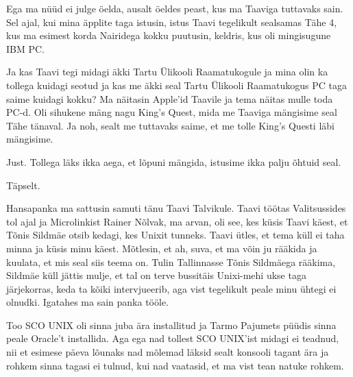 
Ega ma nüüd ei julge öelda, ausalt öeldes peast, kus ma Taaviga tuttavaks sain. 
Sel ajal, kui mina äpplite taga istusin, istus Taavi tegelikult sealsamas Tähe 
4, kus ma esimest korda Nairidega kokku puutusin, keldris, kus oli mingisugune 
IBM PC.

Ja kas Taavi tegi midagi äkki Tartu Ülikooli Raamatukogule ja mina olin ka tollega kuidagi seotud ja kas me äkki seal 
Tartu Ülikooli Raamatukogus PC taga saime kuidagi kokku? Ma näitasin Apple'id 
Taavile ja tema näitas mulle toda PC-d. Oli sihukene mäng nagu King's 
Quest, mida me Taaviga mängisime seal Tähe tänaval. 
Ja noh, sealt me tuttavaks saime, et me tolle King's Questi läbi mängisime.


Just. Tollega läks ikka aega, et lõpuni mängida,  istusime ikka palju õhtuid 
seal.


Täpselt. 


Hansapanka ma sattusin samuti tänu Taavi Talvikule. 
Taavi töötas Valitsussides tol ajal ja 
Microlinkist Rainer Nõlvak, ma 
arvan, oli see, kes küsis Taavi käest,  et Tõnis Sildmäe otsib kedagi, kes Unixit tunneks. Taavi ütles, et tema küll ei taha 
minna ja küsis minu käest. Mõtlesin, et ah, suva, et ma võin ju rääkida ja 
kuulata, et mis seal siis teema on. Tulin Tallinnasse Tõnis Sildmäega rääkima, 
Sildmäe küll jättis mulje, et tal on terve bussitäis Unixi-mehi ukse taga 
järjekorras, keda ta kõiki intervjueerib, aga vist tegelikult peale minu ühtegi 
ei olnudki. Igatahes ma sain panka tööle.

Too SCO UNIX oli sinna juba ära installitud ja Tarmo 
Pajumets püüdis  sinna peale Oracle't 
installida. Aga ega nad tollest SCO UNIX'ist midagi ei teadnud, nii et esimese 
päeva lõunaks nad mõlemad läksid sealt konsooli tagant ära ja rohkem sinna 
tagasi ei tulnud, kui nad vaatasid, et ma vist tean natuke rohkem.

